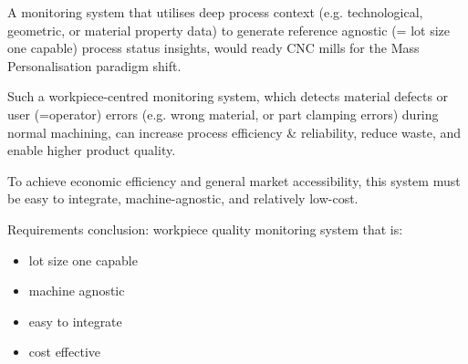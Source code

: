 \documentclass[5p,times,procedia]{elsarticle}
\newenvironment{note}{%
	\noindent
    \color{notecolor}%
}{%
    \par\medskip%
}
\begin{document}
\begin{nomenclature}
\begin{deflist}[AAA]%
\end{deflist}
\end{nomenclature}%


A monitoring system that utilises deep process context (e.g. technological, geometric, or material property data) to generate reference agnostic (= lot size one capable) process status insights, would ready CNC mills for the Mass Personalisation paradigm shift.

Such a workpiece-centred monitoring system, which detects material defects or user (=operator) errors (e.g. wrong material, or part clamping errors) during normal machining, can increase process efficiency \& reliability, reduce waste, and enable higher product quality.  

To achieve economic efficiency and general market accessibility, this system must be easy to integrate, machine-agnostic, and relatively low-cost.

\vspace*{.5\baselineskip}
\noindent Requirements conclusion: workpiece quality monitoring system that is: 
\vspace*{-\baselineskip}
\begin{itemize}
	\item lot size one capable
	\item machine agnostic
	\item easy to integrate
	\item cost effective
\end{itemize}
\end{document}
